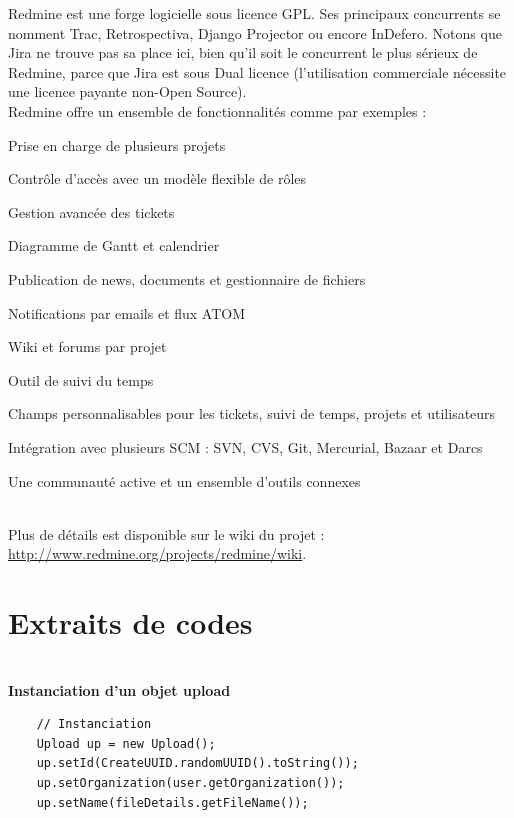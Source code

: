 Redmine est une forge logicielle sous licence GPL. Ses principaux concurrents se nomment Trac, Retrospectiva, Django Projector ou encore InDefero. Notons que Jira ne trouve pas sa place ici, bien qu’il soit le concurrent le plus sérieux de Redmine, parce que Jira est sous Dual licence (l’utilisation commerciale nécessite une licence payante non-Open Source).\\

Redmine offre un ensemble de fonctionnalités comme par exemples :

\begin{itemsize}
\item Prise en charge de plusieurs projets
\item Contrôle d’accès avec un modèle flexible de rôles
\item Gestion avancée des tickets
\item Diagramme de Gantt et calendrier
\item Publication de news, documents et gestionnaire de fichiers
\item Notifications par emails et flux ATOM
\item Wiki et forums par projet
\item Outil de suivi du temps
\item Champs personnalisables pour les tickets, suivi de temps, projets et utilisateurs
\item Intégration avec plusieurs SCM : SVN, CVS, Git, Mercurial, Bazaar et Darcs
\item Une communauté active et un ensemble d’outils connexes
\end{itemsize}\\

Plus de détails est disponible sur le wiki du projet : \url{http://www.redmine.org/projects/redmine/wiki}.

\pagebreak

\section{Extraits de codes}\label{Annexe D}\\

\textbf{Instanciation d'un objet upload}\\
\begin{lstlisting}
	// Instanciation
	Upload up = new Upload();
	up.setId(CreateUUID.randomUUID().toString());
	up.setOrganization(user.getOrganization());
	up.setName(fileDetails.getFileName());
\end{lstlisting} \\

